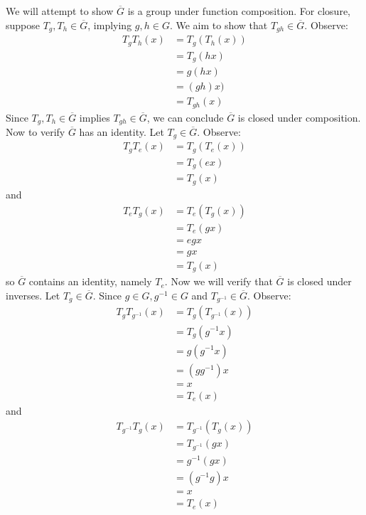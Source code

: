 \documentclass{article}
\begin{document}
We will attempt to show $\overline{G}$ is a group under function composition. For closure, suppose 
$T_g, T_h \in \overline{G}$, implying $g,h \in G$. We aim to show that $T_{gh} \in \overline{G}$. Observe:
\begin{align*}
T_gT_h(x)&=T_g(T_h(x)) \\
&= T_g(hx) \\
&= g(hx) \\
&= (gh)x) \\
&= T_{gh}(x)
\end{align*}
Since $T_g,T_h \in \overline{G}$ implies $T_{gh} \in \overline{G}$, we can conclude $\overline{G}$ is
closed under composition. Now to verify $\overline{G}$ has an identity. Let $T_g \in \overline{G}$. Observe:
\begin{align*}
T_gT_e(x) &= T_g(T_e(x)) \\
&= T_g(ex) \\
&= T_g(x)
\end{align*} and
\begin{align*}
T_eT_g(x) &= T_e(T_g(x)) \\
&= T_e(gx) \\
&= egx \\
&= gx \\
&= T_g(x)
\end{align*} so $\overline{G}$ contains an identity, namely $T_e$. Now we will verify that $\overline{G}$
is closed under inverses. Let $T_g \in \overline{G}$. Since $g \in G, g^{-1} \in G$  and 
$T_{g^{-1}} \in \overline{G}$. Observe:
\begin{align*}
T_gT_{g^{-1}}(x) &= T_g(T_{g^{-1}}(x)) \\
&= T_g(g^{-1}x) \\
&= g(g^{-1}x) \\ 
&= (gg^{-1})x \\ 
&= x \\ 
&= T_e(x)
\end{align*} and
\begin{align*}
T_{g^{-1}}T_g(x) &= T_{g^{-1}}(T_g(x)) \\
&= T_{g^{-1}}(gx) \\
&= g^{-1}(gx) \\
&= (g^{-1}g)x \\
&= x \\
&= T_e(x)
\end{align*}
\end{document}
